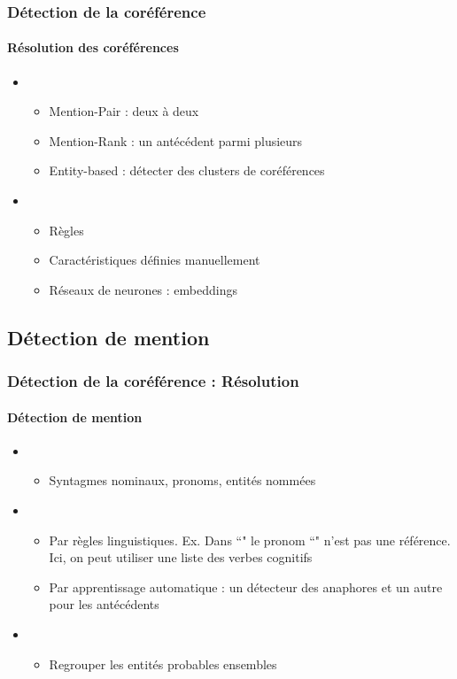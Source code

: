 \documentclass[xcolor=table]{beamer}
\begin{document}
\begin{frame}
	\frametitle{Détection de la coréférence}
	\framesubtitle{Résolution des coréférences}
	
	
	\begin{itemize}
		\item {}
		\begin{itemize}
			\item Mention-Pair : deux à deux
			\item Mention-Rank : un antécédent parmi plusieurs
			\item Entity-based : détecter des clusters de coréférences
		\end{itemize}
		
		\item {}
		\begin{itemize}
			\item Règles
			\item Caractéristiques définies manuellement
			\item Réseaux de neurones : embeddings
		\end{itemize}
	\end{itemize}
	
\end{frame}


\subsection{Détection de mention}

\begin{frame}
	\frametitle{Détection de la coréférence : Résolution}
	\framesubtitle{Détection de mention}
	
	\begin{itemize}
		\item {}
		\begin{itemize}
			\item Syntagmes nominaux, pronoms, entités nommées
		\end{itemize}
	
		\item {}
		\begin{itemize}
			\item Par règles linguistiques. Ex. Dans ``" le pronom ``" n'est pas une référence. Ici, on peut utiliser une liste des verbes cognitifs 
			\item Par apprentissage automatique : un détecteur des anaphores et un autre pour les antécédents
		\end{itemize}
	
		\item {}
		\begin{itemize}
			\item Regrouper les entités probables ensembles
		\end{itemize}
	\end{itemize}
	
\end{frame}
\end{document}
